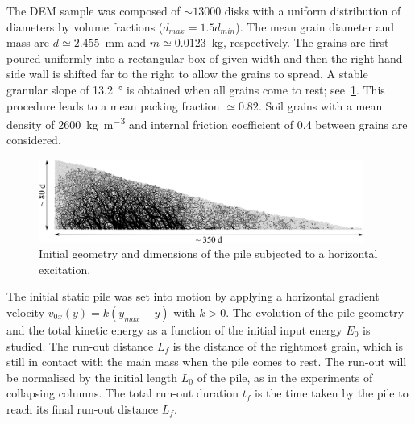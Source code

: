 The DEM sample was composed of $\sim13000$ disks with a uniform distribution of 
diameters by volume fractions ($d_{max} = 1.5 d_{min}$). The mean grain 
diameter and mass are $d\simeq 2.455 $~\si{\mm} and $m\simeq 0.0123$~\si{\kg}, 
respectively. The grains are first poured uniformly into a rectangular box of 
given width and then the right-hand side wall is shifted far to the right 
to allow the grains to spread. A stable granular slope of 13.2~\si{\degree} is 
obtained when all grains come to rest; see~\cref{fig:slope_configuration}. This 
procedure leads to a mean packing fraction $\simeq 0.82$. Soil grains with a 
mean density of 2600~\si{\kg\per\m\cubed} and internal friction coefficient of 
0.4 between grains are considered.

\begin{figure}[tbhp]
\includegraphics[width=0.95\textwidth]{slope_configuration}
\caption{Initial geometry and dimensions of the pile subjected to a horizontal 
excitation.}
\label{fig:slope_configuration}
\end{figure}


The initial static pile was set into motion by applying a horizontal
gradient velocity $v_{0x}(y) = k (y_{max} - y)$ with $k>0$. The evolution of 
the pile geometry and the total kinetic energy as a function of the initial 
input energy $E_0$ is studied. The run-out distance $L_f$ is the distance of 
the rightmost grain, which is still in contact with the main mass when the pile 
comes to rest. The run-out will be normalised by the initial length $L_0$ of 
the pile, as in the experiments of collapsing columns. The total run-out 
duration $t_f$ is the time taken by the pile to reach its final run-out 
distance $L_f$.

